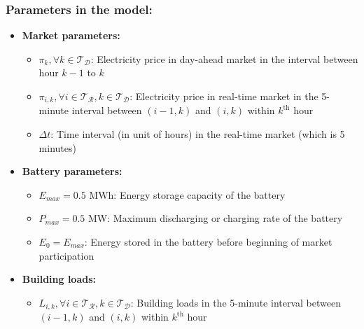 \documentclass[11pt,twoside]{article}
\begin{document}
\subsubsection{Parameters in the model:}
\begin{itemize}
\item\textbf{Market parameters:}
\begin{itemize}
\item[\textbullet] $\pi_{k}, \forall k \in \mathcal{T_D}$: Electricity price in day-ahead market in the interval between hour $k-1$ to $k$
\item[\textbullet] $\pi_{i,k}, \forall i \in \mathcal{T_R}, k \in \mathcal{T_D}$: Electricity price in real-time market in the 5-minute interval between $(i-1,k)$ and $(i,k)$ within $k^\text{th}$ hour
\item[\textbullet] $\Delta t$: Time interval (in unit of hours) in the real-time market (which is 5 minutes)
\end{itemize}
\item\textbf{Battery parameters:}
\begin{itemize}
\item[\textbullet] $E_{max} = 0.5$ MWh: Energy storage capacity of the battery
\item[\textbullet] $P_{max} = 0.5$ MW: Maximum discharging or charging rate of the battery
\item[\textbullet] $E_{0} = E_{max}$: Energy stored in the battery before beginning of market participation
\end{itemize}
\item\textbf{Building loads:}
\begin{itemize}
\item[\textbullet] $L_{i,k}, \forall i \in \mathcal{T_R}, k \in \mathcal{T_D}$: Building loads in the 5-minute interval between $(i-1,k)$ and $(i,k)$ within $k^\text{th}$ hour
\end{itemize}
\end{itemize}
\end{document}
